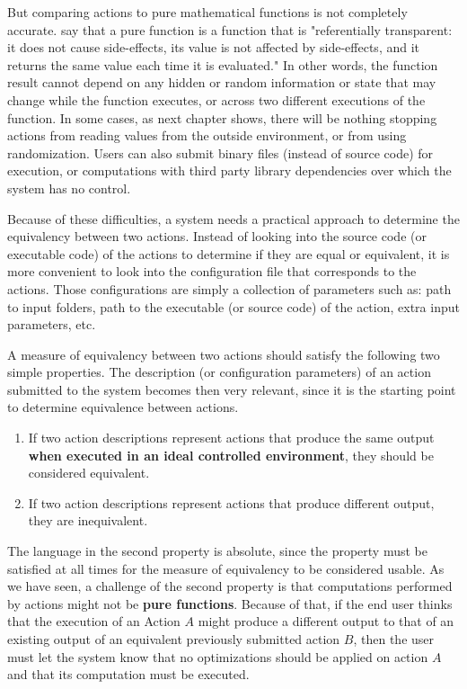 But comparing actions to pure mathematical functions is not completely accurate.  \cite{gifford1986integrating} say that a pure function is a function that is "referentially transparent: it does not cause side-effects, its value is not affected by side-effects, and it returns the same value each time it is evaluated." In other words, the function result cannot depend on any hidden or random information or state that may change while the function executes, or across two different executions of the function. In some cases, as next chapter shows, there will be nothing stopping actions from reading values from the outside environment, or from using randomization. Users can also submit binary files (instead of source code) for execution, or computations with third party library dependencies over which the system has no control.

Because of these difficulties, a system needs a practical approach to determine the equivalency between two actions.  Instead of looking into the source code (or executable code) of the actions to determine if they are equal or equivalent, it is more convenient to look into the configuration file that corresponds to the actions. Those configurations are simply a collection of parameters such as: path to input folders, path to the executable (or source code) of the action, extra input parameters, etc. 

A measure of equivalency between two actions should satisfy the following two simple properties. The description (or configuration parameters) of an action submitted to the system becomes then very relevant, since it is the starting point to determine equivalence between actions. 

\begin{enumerate}
\item If two action descriptions represent actions that produce the same output \textbf{when executed in an ideal controlled environment}, they should be considered equivalent.
\item If two action descriptions represent actions that produce different output, they are inequivalent.
\end{enumerate}

The language in the second property is absolute, since the property must be satisfied at all times for the measure of equivalency to be considered usable.  As we have seen, a challenge of the second property is that computations performed by actions might not be \textbf{pure functions}.  Because of that, if the end user thinks that the execution of an Action $A$  might produce a different output to that of an existing output of an equivalent previously submitted action $B$, then the user must let the system know that no optimizations should be applied on action $A$ and that its computation must be executed. 

